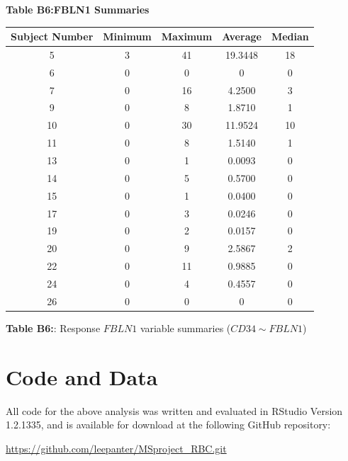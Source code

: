 \documentclass[12pt,]{article}
\begin{document}
\begin{center}
\begin{scriptsize}

\textbf{\large{Table B6:FBLN1 Summaries}}


\begin{tabular}{|c|c|c|c|c|}
\hline 
Subject Number & Minimum & Maximum & Average & Median \\ 
\hline
\hline
5  & 3 & 41 & 19.3448 & 18 \\ 
\hline 
6  & 0 & 0 & 0 & 0 \\ 
\hline 
7  & 0 & 16 & 4.2500 & 3 \\ 
\hline 
9  & 0 & 8 & 1.8710 & 1 \\ 
\hline 
10 & 0 & 30 & 11.9524 & 10 \\ 
\hline 
11 & 0 & 8 & 1.5140 & 1 \\ 
\hline 
13 & 0 & 1 & 0.0093 & 0 \\ 
\hline 
14 & 0 & 5 & 0.5700 & 0 \\ 
\hline 
15 & 0 & 1 & 0.0400 & 0 \\ 
\hline 
17 & 0 & 3 & 0.0246 & 0 \\ 
\hline 
19 & 0 & 2 & 0.0157 & 0 \\ 
\hline 
20 & 0 & 9 & 2.5867 & 2 \\ 
\hline 
22 & 0 & 11 & 0.9885 & 0 \\ 
\hline 
24 & 0 & 4 & 0.4557 & 0 \\ 
\hline 
26 & 0 & 0 & 0 & 0 \\ 
\hline
\end{tabular}

\vspace{5pt}

\textbf{Table B6:}: Response $FBLN1$ variable summaries ($CD34 \sim FBLN1$)

\end{scriptsize}
\end{center}

\newpage

\hypertarget{code-and-data}{%
\section{Code and Data}\label{code-and-data}}

All code for the above analysis was written and evaluated in RStudio
Version 1.2.1335, and is available for download at the following GitHub
repository:

\url{https://github.com/leepanter/MSproject_RBC.git}
\end{document}
